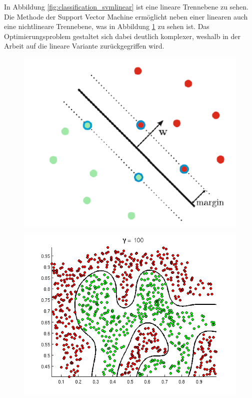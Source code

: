 In Abbildung \ref{fig:classification_svmlinear} ist eine lineare Trennebene zu sehen. Die Methode der Support Vector Machine erm\"oglicht neben einer linearen auch eine nichtlineare Trennebene, was in Abbildung \ref{fig:classification_svmnonlinear} zu sehen ist. Das Optimierungsproblem gestaltet sich dabei deutlich komplexer, weshalb in der Arbeit auf die lineare Variante zur\"uckgegriffen wird.

\begin{figure}
\centering
\begin{minipage}{.5\textwidth}
  \centering
  \includegraphics[width=1\textwidth]{media/classification/svm_linear.png}
  \label{fig:classification_svmlinear}
\end{minipage}%
\begin{minipage}{.5\textwidth}
  \centering
  \includegraphics[width=1\textwidth]{media/classification/svm_nonlinear.png}
  \label{fig:classification_svmnonlinear}
\end{minipage}
\end{figure}

